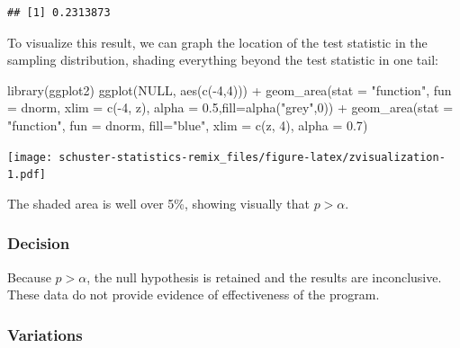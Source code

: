 \documentclass[
]{book}
\newenvironment{Shaded}{\begin{snugshade}}{\end{snugshade}}
\newcommand{\AttributeTok}[1]{\textcolor[rgb]{0.77,0.63,0.00}{#1}}
\newcommand{\ConstantTok}[1]{\textcolor[rgb]{0.00,0.00,0.00}{#1}}
\newcommand{\DecValTok}[1]{\textcolor[rgb]{0.00,0.00,0.81}{#1}}
\newcommand{\FloatTok}[1]{\textcolor[rgb]{0.00,0.00,0.81}{#1}}
\newcommand{\FunctionTok}[1]{\textcolor[rgb]{0.00,0.00,0.00}{#1}}
\newcommand{\NormalTok}[1]{#1}
\newcommand{\SpecialCharTok}[1]{\textcolor[rgb]{0.00,0.00,0.00}{#1}}
\newcommand{\StringTok}[1]{\textcolor[rgb]{0.31,0.60,0.02}{#1}}
\begin{document}
\begin{verbatim}
## [1] 0.2313873
\end{verbatim}

To visualize this result, we can graph the location of the test statistic in the sampling distribution, shading everything beyond the test statistic in one tail:

\begin{Shaded}
\begin{Highlighting}[]
\FunctionTok{library}\NormalTok{(ggplot2)}
\FunctionTok{ggplot}\NormalTok{(}\ConstantTok{NULL}\NormalTok{, }\FunctionTok{aes}\NormalTok{(}\FunctionTok{c}\NormalTok{(}\SpecialCharTok{{-}}\DecValTok{4}\NormalTok{,}\DecValTok{4}\NormalTok{))) }\SpecialCharTok{+}
  \FunctionTok{geom\_area}\NormalTok{(}\AttributeTok{stat =} \StringTok{"function"}\NormalTok{, }\AttributeTok{fun =}\NormalTok{ dnorm, }\AttributeTok{xlim =} \FunctionTok{c}\NormalTok{(}\SpecialCharTok{{-}}\DecValTok{4}\NormalTok{, z), }\AttributeTok{alpha =} \FloatTok{0.5}\NormalTok{,}\AttributeTok{fill=}\FunctionTok{alpha}\NormalTok{(}\StringTok{"grey"}\NormalTok{,}\DecValTok{0}\NormalTok{)) }\SpecialCharTok{+}
  \FunctionTok{geom\_area}\NormalTok{(}\AttributeTok{stat =} \StringTok{"function"}\NormalTok{, }\AttributeTok{fun =}\NormalTok{ dnorm, }\AttributeTok{fill=}\StringTok{"blue"}\NormalTok{, }\AttributeTok{xlim =} \FunctionTok{c}\NormalTok{(z, }\DecValTok{4}\NormalTok{), }\AttributeTok{alpha =} \FloatTok{0.7}\NormalTok{)}
\end{Highlighting}
\end{Shaded}

\texttt{[image: schuster-statistics-remix\_files/figure-latex/zvisualization-1.pdf]}

The shaded area is well over 5\%, showing visually that \(p\gt\alpha\).

\hypertarget{decision}{%
\subsubsection{Decision}\label{decision}}

Because \(p > \alpha\), the null hypothesis is retained and the results are inconclusive. These data do not provide evidence of effectiveness of the program.

\hypertarget{variations}{%
\subsubsection{Variations}\label{variations}}
\end{document}
